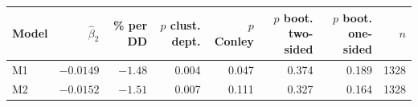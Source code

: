 \begin{tabular}{lrrrrrrr}
\toprule
Model & $\hat\beta_2$ & \% per DD & \shortstack{$p$ clust.\\dept.} & \shortstack{$p$\\Conley} & \shortstack{$p$ boot.\\two-sided} & \shortstack{$p$ boot.\\one-sided} & $n$ \\
\midrule
M1 & $-0.0149$ & $-1.48$ & 0.004 & 0.047 & 0.374 & 0.189 & 1328 \\
M2 & $-0.0152$ & $-1.51$ & 0.007 & 0.111 & 0.327 & 0.164 & 1328 \\
\bottomrule
\end{tabular}
